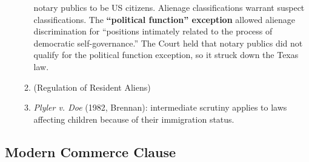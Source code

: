 \begin{enumerate}
\begin{enumerate}
        notary publics to be US citizens. Alienage classifications warrant 
        suspect classifications. The \textbf{``political function'' exception} 
        allowed alienage discrimination for ``positions intimately related to 
        the process of democratic self-governance.'' The Court held that 
        notary publics did not qualify for the political function exception, 
        so it struck down the Texas law.
        \item (Regulation of Resident Aliens) %
        \item \emph{Plyler v. Doe} (1982, Brennan): intermediate scrutiny 
        applies to laws affecting children because of their immigration 
        status.
    \end{enumerate}
\end{enumerate}

\subsection{Modern Commerce Clause}

